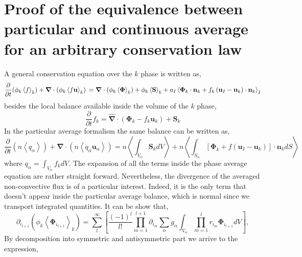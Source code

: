 \documentclass[twocolumn]{My_article}
\newcommand{\kavg}[1]{\left<#1\right>_k}
\newcommand{\Iavg}[1]{\left<#1\right>_I}
\newcommand{\pavg}[1]{n \left<#1\right>}
\newcommand{\nablab}{\bm{\nabla}}
\newcommand{\nablabh}{\hat{\bm{\nabla}}}
\newcommand{\pddt}{\frac{\partial}{\partial t}}
\begin{document}
\section{Proof of the equivalence between particular and continuous average for an arbitrary conservation law}
\label{ap:exp}


A general conservation equation over the $k$ phase is written as,
\begin{equation*}
    \frac{\partial}{\partial t} (\phi_k\kavg{f})
    + \nablab \cdot \left(
        \phi_k \kavg{f \textbf{u}}
    \right)\\
    = \nablab \cdot \left(
        \phi_k \kavg{\bm{\Phi}}
    \right)
    + \phi_k \kavg{\textbf{S}}
    + a_I \Iavg{
        \bm{\Phi}_k \cdot \textbf{n}_k
        + f_k
        \left(
            \textbf{u}_I
            - \textbf{u}_k
        \right) \cdot \textbf{n}_k
    }
\label{ap:eq:avg_k_global}
\end{equation*}
besides the local balance available inside the volume of the $k$ phase,
\begin{equation}
    \pddt f_k
    = \nablabh \cdot \left(
        \bm{\Phi}_k
        - f_k\textbf{u}_k
        \right)
    + \textbf{S}_k
\end{equation}
In the particular average formalism the same balance can be written as,
\begin{equation}
    \pddt   \left(\pavg{q_\alpha}\right)
    + \nablab \cdot \left(\pavg{q_\alpha \textbf{u}_\alpha}\right)
    = \pavg{\int_{V_\alpha} \textbf{S}_k dV }
    + \pavg{\int_{S_\alpha} \left[\bm{\Phi}_k + f (\textbf{u}_I-\textbf{u}_k) \right] \cdot \textbf{n}_k d S}
\end{equation}
where $q_\alpha = \int_{V_\alpha} f_k dV$.
The expansion of all the terms inside the phase average equation are rather straight forward.
Nevertheless, the divergence of the averaged non-convective flux is of a particular interest.
Indeed, it is the only term that doesn't appear inside the particular average balance, which is normal since we transport integrated quantities.
It can be show that,
\begin{equation}
    \partial_{i_{l+1}}
    (\phi_k \kavg{\bm{\Phi}_{i_{l+1}}})=
    \sum_l^\infty
    \left[
        \frac{(-1)^{l}}{l!}
        \prod^{l+1}_{m=1}
        \partial_{i_m}
        \sum_{\alpha}
        g_{\alpha}
        \int_{V_\alpha}
        \prod^{l}_{m=1}
        r_{i_m} \bm{\Phi}_{i_{l+1}}dV
    \right],
\end{equation}
By decomposition into symmetric and antisymmetric part we arrive to the expression,
\end{document}
